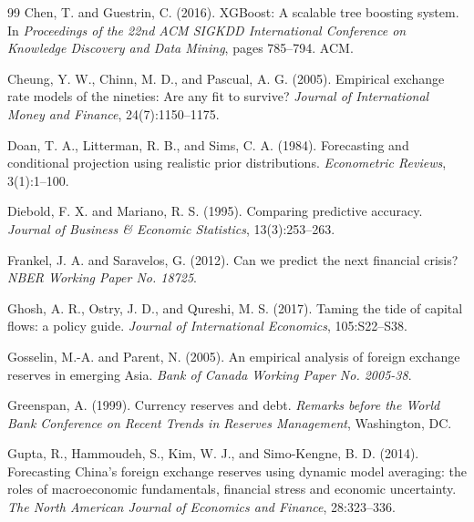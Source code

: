 \documentclass[12pt,a4paper]{article}
\begin{document}
\begin{thebibliography}{99}
Chen, T. and Guestrin, C. (2016).
\newblock XGBoost: A scalable tree boosting system.
\newblock In \textit{Proceedings of the 22nd ACM SIGKDD International Conference on Knowledge Discovery and Data Mining}, pages 785--794. ACM.

Cheung, Y. W., Chinn, M. D., and Pascual, A. G. (2005).
\newblock Empirical exchange rate models of the nineties: Are any fit to survive?
\newblock \textit{Journal of International Money and Finance}, 24(7):1150--1175.

Doan, T. A., Litterman, R. B., and Sims, C. A. (1984).
\newblock Forecasting and conditional projection using realistic prior distributions.
\newblock \textit{Econometric Reviews}, 3(1):1--100.

Diebold, F. X. and Mariano, R. S. (1995).
\newblock Comparing predictive accuracy.
\newblock \textit{Journal of Business \& Economic Statistics}, 13(3):253--263.

Frankel, J. A. and Saravelos, G. (2012).
\newblock Can we predict the next financial crisis?
\newblock \textit{NBER Working Paper No. 18725}.

Ghosh, A. R., Ostry, J. D., and Qureshi, M. S. (2017).
\newblock Taming the tide of capital flows: a policy guide.
\newblock \textit{Journal of International Economics}, 105:S22--S38.

Gosselin, M.-A. and Parent, N. (2005).
\newblock An empirical analysis of foreign exchange reserves in emerging Asia.
\newblock \textit{Bank of Canada Working Paper No. 2005-38}.

Greenspan, A. (1999).
\newblock Currency reserves and debt.
\newblock \textit{Remarks before the World Bank Conference on Recent Trends in Reserves Management}, Washington, DC.

Gupta, R., Hammoudeh, S., Kim, W. J., and Simo-Kengne, B. D. (2014).
\newblock Forecasting China's foreign exchange reserves using dynamic model averaging: the roles of macroeconomic fundamentals, financial stress and economic uncertainty.
\newblock \textit{The North American Journal of Economics and Finance}, 28:323--336.


\end{thebibliography}
\end{document}
